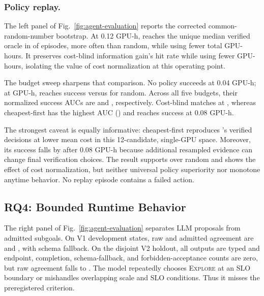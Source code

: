 \subsubsection{Policy replay.}
The left panel of Fig.~\ref{fig:agent-evaluation} reports the corrected
common-random-number bootstrap.  At 0.12 GPU-h, \ipig{} reaches the unique
median verified oracle in
\IPIGOracleHit{} of episodes, \IPIGRandomHitGain{} more often than random, while
using \IPIGRandomGPUSaving{} fewer total GPU-hours.  It preserves cost-blind
information gain's hit rate while using \IPIGCostBlindGPUSaving{} fewer
GPU-hours, isolating the value of cost normalization at this operating point.

The budget sweep sharpens that comparison.  No policy succeeds at 0.04 GPU-h;
at \BudgetThresholdGPUHours{} GPU-h, \ipig{} reaches \IPIGHitAtThreshold{}
success versus \RandomHitAtThreshold{} for random.  Across all five budgets,
their normalized success AUCs are \IPIGSuccessAUC{} and \RandomSuccessAUC{},
respectively.  Cost-blind matches \ipig{} at \CostBlindSuccessAUC{}, whereas
cheapest-first has the highest AUC (\CheapestSuccessAUC{}) and reaches
\CheapestHitAtThreshold{} success at 0.08 GPU-h.

The strongest caveat is equally informative: cheapest-first reproduces
\ipig{}'s verified decisions at \CheapestIPIGGPUSaving{} lower mean cost in
this 12-candidate, single-GPU space.  Moreover, its success falls by
\CheapestBudgetDrop{} after 0.08 GPU-h because additional resampled evidence can
change final verification choices.  The result supports \ipig{} over random and
shows the effect of cost normalization, but neither universal policy superiority
nor monotone anytime behavior.  No replay episode contains a failed action.



\subsection{RQ4: Bounded Runtime Behavior}

The right panel of Fig.~\ref{fig:agent-evaluation} separates LLM proposals
from admitted subgoals.  On V1 development states, raw and
admitted agreement are
\PlannerVoneRaw{} and \PlannerVoneAdmitted{}, with \PlannerVoneFallback{} schema
fallback.  On the disjoint V2 holdout, all outputs are typed and endpoint,
completion, schema-fallback, and forbidden-acceptance counts are zero, but raw
agreement falls to \PlannerVtwoRaw{}.  The model repeatedly chooses
\textsc{Explore} at an SLO boundary or mishandles overlapping scale and SLO
conditions.  Thus it misses the preregistered \PlannerRawThreshold{} criterion.

